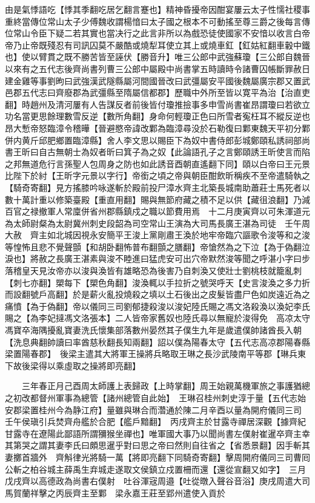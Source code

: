 由是氣悸語吃【悸其季翻吃居乞翻言蹇也】精神昏擾帝因酣宴屢云太子性懦社稷事重終當傳位常山太子少傅魏收謂楊愔曰太子國之根本不可動搖至尊三爵之後每言傳位常山令臣下疑二若其實也當决行之此言非所以為戲恐徒使國家不安愔以收言白帝帝乃止帝既殘忍有司訊囚莫不嚴酷或燒犁耳使立其上或燒車釭【釭姑紅翻車轂中鐵也】使以臂貫之既不勝苦皆至誣伏【勝音升】唯三公郎中武強蘇瓊【三公郎自魏晉以來有之五代志後齊尚書列曹三公郎中屬殿中尚書掌五時讀時令諸曹囚帳斷罪赦日建金雞等事劉昫曰武強漢武隧縣屬河間國晉改曰武彊屬安平國後魏屬廣宗郡又置武邑郡五代志曰齊廢郡為武彊縣至隋屬信都郡】歷職中外所至皆以寛平為治【治直吏翻】時趙州及清河屢有人告謀反者前後皆付瓊推撿事多申雪尚書崔昂謂瓊曰若欲立功名當更思餘理數雪反逆【數所角翻】身命何輕瓊正色曰所雪者寃枉耳不縱反逆也昂大慙帝怒臨漳令稽曄【晉避愍帝諱改鄴為臨漳尋没於石勒復曰鄴東魏天平初分鄴併内黄斤邱肥鄉置臨漳縣】舍人李文思以賜臣下為奴中書侍郎彭城鄭頤私誘祠部尚書王昕曰自古無朝士為奴者昕曰箕子為之奴【此論語孔子之言鄭頤誘王昕使言而陷之邦無道危行言孫聖人包周身之防也如此誘音酉朝直遙翻下同】頤以白帝曰王元景比陛下於紂【王昕字元景以字行】帝銜之頃之帝與朝臣酣飲昕稱疾不至帝遣騎執之【騎奇寄翻】見方搖膝吟咏遂斬於殿前投尸漳水齊主北築長城南助蕭莊士馬死者以數十萬計重以修築臺殿【重直用翻】賜與無節府藏之積不足以供【藏徂浪翻】乃減百官之禄撤軍人常廩併省州郡縣鎮戍之職以節費用焉　十二月庚寅齊以可朱渾道元為太師尉粲為太尉冀州刺史段韶為司空常山王演為大司馬長廣王湛為司徒　壬午周大赦　齊主如北城因視永安簡平王浚上黨剛肅王渙於地牢帝臨穴謳歌令浚等和之浚等惶怖且悲不覺聲顫【和胡卧翻怖普布翻顫之膳翻】帝愴然為之下泣【為于偽翻泣淚也】將赦之長廣王湛素與浚不睦進曰猛虎安可出穴帝默然浚等聞之呼湛小字曰步落稽皇天見汝帝亦以浚與渙皆有雄略恐為後害乃自刺渙又使壯士劉桃枝就籠亂刺【刺七亦翻】槊每下【槊色角翻】浚渙輒以手拉折之號哭呼天【史言浚渙之多力折而設翻號戶高翻】於是薪火亂投燒殺之填以土石後出之皮髮皆盡尸色如炭遠近為之痛憤【為于偽翻】帝以儀同三司劉郁捷殺浚以浚妃陸氏賜之馮文洛殺渙以渙妃李氏賜之【為李妃撻馮文洛張本】二人皆帝家舊奴也陸氏尋以無寵於浚得免　高凉太守馮寶卒海隅擾亂寶妻洗氏懷集部落數州晏然其子僕生九年是歲遣僕帥諸酋長入朝【洗息典翻帥讀曰率酋慈秋翻長知兩翻】詔以僕為陽春太守【五代志高凉郡陽春縣梁置陽春郡】　後梁主遣其大將軍王操將兵略取王琳之長沙武陵南平等郡【琳兵東下故後梁得以乘虛取之操將即亮翻】

　　三年春正月己酉周太師護上表歸政【上時掌翻】周王始親萬機軍旅之事護猶總之初改都督州軍事為總管【諸州總管自此始】　王琳召桂州刺史淳于量【五代志始安郡梁置桂州今為静江府】量雖與琳合而濳通於陳二月辛酉以量為開府儀同三司　壬午侯瑱引兵焚齊舟艦於合肥【艦戶黯翻】　丙戌齊主於甘露寺禪居深觀【據齊紀甘露寺在遼陽此鄙語所謂獼猴坐禪也】唯軍國大事乃以聞尚書左僕射崔暹卒齊主幸其第哭之謂其妻李氏曰頗思暹乎對曰思之帝曰然則自往省之【省悉景翻】因手斬其妻擲首牆外　齊斛律光將騎一萬【將即亮翻下同騎奇寄翻】擊周開府儀同三司曹囘公斬之柏谷城主薛禹生弃城走遂取文侯鎮立戍置柵而還【還從宣翻又如字】　三月戊戌齊以高德政為尚書右僕射　吐谷渾宼周邉【吐從暾入聲谷音浴】庚戌周遣大司馬賀蘭祥擊之丙辰齊主至鄴　梁永嘉王莊至郢州遣使入貢於

